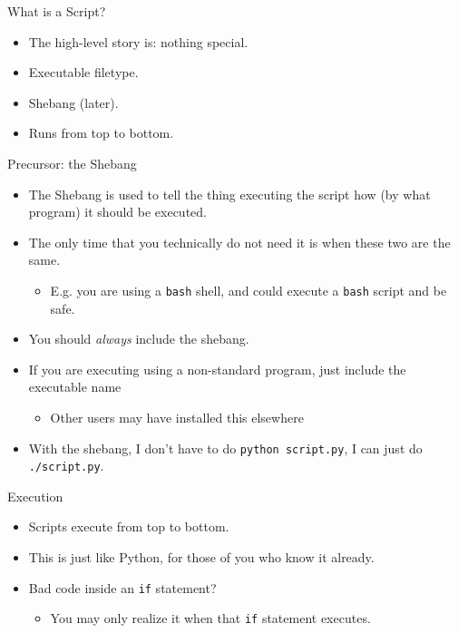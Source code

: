\begin{frame}[fragile]{What is a Script?}
  \begin{itemize}[<+- | alert@+>]
    \item The high-level story is: nothing special.
    \item Executable filetype.
    \item Shebang (later).
    \item Runs from top to bottom.
  \end{itemize}
\end{frame}

\begin{frame}[fragile]{Precursor: the Shebang}
  \begin{itemize}[<+- | alert@+>]
    \item The Shebang\cite{shebang} is used to tell the thing executing the script how (by what program) it should be executed.
    \item The only time that you technically do not need it is when these two are the same.
    \begin{itemize}[<+- | alert@+>]
      \item E.g. you are using a \texttt{bash} shell, and could execute a \texttt{bash} script and be safe.
    \end{itemize}
    \item You should \emph{always} include the shebang.
    \item If you are executing using a non-standard program, just include the executable name
    \begin{itemize}[<+- | alert@+>]
      \item Other users may have installed this elsewhere
    \end{itemize}
    \item With the shebang, I don't have to do \texttt{python script.py}, I can just do \texttt{./script.py}.
  \end{itemize}
\end{frame}

\begin{frame}[fragile]{Execution}
  \begin{itemize}[<+- | alert@+>]
    \item Scripts execute from top to bottom.
    \item This is just like Python, for those of you who know it already.
    \item Bad code inside an \texttt{if} statement?
    \begin{itemize}[<+- | alert@+>]
      \item You may only realize it when that \texttt{if} statement executes.
    \end{itemize}
  \end{itemize}
\end{frame}

